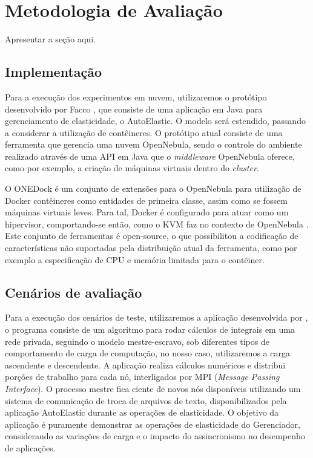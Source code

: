\documentclass[twoside,english,brazilian]{UNISINOSartigo}
\begin{document}
\section{Metodologia de Avaliação}
Apresentar a seção aqui.

\subsection{Implementação}
\label{prototype}

Para a execução dos experimentos em nuvem, utilizaremos o protótipo desenvolvido por Facco , que consiste de uma aplicação em Java para gerenciamento de elasticidade, o AutoElastic. O modelo será estendido, passando a considerar a utilização de contêineres. O protótipo atual consiste de uma ferramenta que gerencia uma nuvem OpenNebula, sendo o controle do ambiente realizado através de uma API em Java que o \textit{middleware} OpenNebula oferece, como por exemplo, a criação de máquinas virtuais dentro do \textit{cluster}. 

O ONEDock é um conjunto de extensões para o OpenNebula para utilização de Docker contêineres como entidades de primeira classe, assim como se fossem máquinas virtuais leves. Para tal, Docker é configurado para atuar como um hipervisor, comportando-se então, como o KVM faz no contexto de OpenNebula \cite{onedock2015}. Este conjunto de ferramentas é open-source, o que possibilitou a codificação de características não suportadas pela distribuição atual da ferramenta, como por exemplo a especificação de CPU e memória limitada para o contêiner.

\subsection{Cenários de avaliação}
\label{cenarios}

Para a execução dos cenários de teste, utilizaremos a aplicação desenvolvida por , o programa consiste de um algoritmo para rodar cálculos de integrais em uma rede privada, seguindo o modelo mestre-escravo, sob diferentes tipos de comportamento de carga de computação, no nosso caso, utilizaremos a carga ascendente e descendente. A aplicação realiza cálculos numéricos e distribui porções de trabalho para cada nó, interligados por MPI (\textit{Message Passing Interface}). O processo mestre fica ciente de novos nós disponíveis utilizando um sistema de comunicação de troca de arquivos de texto, disponibilizados pela aplicação AutoElastic durante as operações de elasticidade. O objetivo da aplicação é puramente demonstrar as operações de elasticidade do Gerenciador, considerando as variações de carga e o impacto do assincronismo no desempenho de aplicações.
\end{document}
